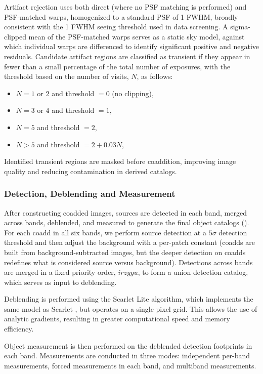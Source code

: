 Artifact rejection uses both direct (where no PSF matching is performed) and PSF-matched warps, homogenized to a standard PSF of 1 FWHM, broadly consistent with the 1  FWHM \gls{seeing} threshold used in data screening.
A sigma-clipped mean of the \gls{PSF}-matched warps serves as a static sky model, against which individual warps are differenced to identify significant positive and negative residuals.
Candidate artifact regions are classified as \gls{transient} if they appear in fewer than a small percentage of the total number of exposures, with the threshold  based on the number of visits, $N$,  as follows:
\begin{itemize}
    \item $N = 1$ or $2$ and threshold $ = 0$ (no clipping),
    \item $N = 3$ or $4$ and threshold $ = 1$,
    \item $N = 5$ and threshold $ = 2$,
    \item $N > 5$ and threshold $ = 2 + 0.03N$,
\end{itemize}
Identified \gls{transient} regions are masked before coaddition, improving image quality and reducing contamination in derived catalogs.

\subsubsection{Detection, Deblending and Measurement}
\label{sssec:coadd_processing}
After constructing coadded images, sources are detected in each band, merged across bands, deblended, and measured to generate the final object catalogs  ().
For each coadd in all six bands, we perform source detection at a $5\sigma$ detection threshold and then adjust the background with a per-patch constant (coadds are built from background-subtracted images, but the deeper detection on coadds redefines what is considered source versus background).
Detections across bands are merged in a fixed priority order, $irzygu$, to form a union detection catalog, which serves as input to deblending.

Deblending is performed using the Scarlet Lite algorithm, which implements the same model as Scarlet \citep[][]{2018A&C....24..129M}, but operates on a single pixel grid.
This allows the use of analytic gradients, resulting in greater computational speed and memory efficiency.

\gls{Object} measurement is then performed on the deblended detection footprints in each band.
Measurements are conducted in three modes: independent per-band measurements, forced measurements in each band, and multiband measurements.

